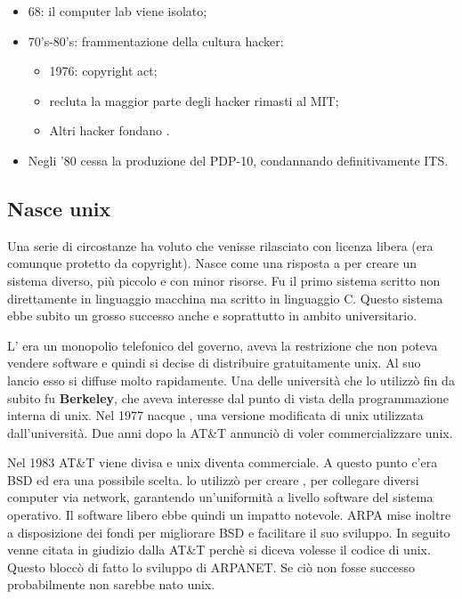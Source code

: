\begin{itemize}

\item 68: il computer lab viene isolato;
\item 70's-80's: frammentazione della cultura hacker:

	\begin{itemize}

	\item 1976: copyright act;
	\item {} recluta la maggior parte degli hacker rimasti al MIT;
	\item Altri hacker fondano .

	\end{itemize}

\item Negli '80 cessa la produzione del PDP-10, condannando definitivamente ITS.

\end{itemize}

\subsection{Nasce unix}

Una serie di circostanze ha voluto che  venisse rilasciato con licenza libera (era comunque protetto da copyright). Nasce come una risposta a  per creare un sistema diverso, più piccolo e con minor risorse. Fu il primo sistema scritto non direttamente in linguaggio macchina ma scritto in linguaggio C. Questo sistema ebbe subito un grosso successo anche e soprattutto in ambito universitario. 

L' era un monopolio telefonico del governo, aveva la restrizione che non poteva vendere software e quindi si decise di distribuire gratuitamente unix. Al suo lancio esso si diffuse molto rapidamente. Una delle università che lo utilizzò fin da subito fu \textbf{Berkeley}, che aveva interesse dal punto di vista della programmazione interna di unix. Nel 1977 nacque , una versione modificata di unix utilizzata dall'università. Due anni dopo la AT\&T annunciò di voler commercializzare unix. 

Nel 1983 AT\&T viene divisa e unix diventa commerciale. A questo punto c'era BSD ed era una possibile scelta.  lo utilizzò per creare , per collegare diversi computer via network, garantendo un'uniformità a livello software del sistema operativo. Il software libero ebbe quindi un impatto notevole. ARPA mise inoltre a disposizione dei fondi per migliorare BSD e facilitare il suo sviluppo. In seguito venne citata in giudizio dalla AT\&T perchè si diceva volesse il codice di unix. Questo bloccò di fatto lo sviluppo di ARPANET. Se ciò non fosse successo probabilmente non sarebbe nato unix.


